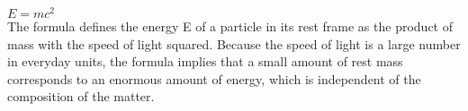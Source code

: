 $E=mc^2$
\\
The formula defines the energy E of a particle in its rest frame as the product of mass with the speed of light squared. Because the speed of light is a large number in everyday units, the formula implies that a small amount of rest mass corresponds to an enormous amount of energy, which is independent of the composition of the matter. 